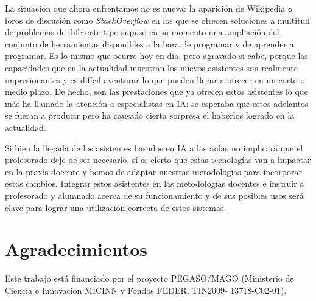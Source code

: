 \documentclass[twocolumn,twoside,a4paper, 10pt]{article}
\begin{document}
La situación que ahora enfrentamos no es nueva: la aparición de Wikipedia 
o foros de discusión como
\textit{StackOverflow} en los que se ofrecen soluciones a multitud de problemas de diferente tipo supuso en su
momento una ampliación del conjunto de herramientas disponibles a la hora de programar y de aprender a
programar.
Es lo mismo que ocurre hoy en día, pero agravado si cabe, porque las capacidades que en la
actualidad muestran los nuevos asistentes son realmente impresionantes y es difícil aventurar lo que pueden
llegar a ofrecer en un corto o medio plazo.
De hecho, son las prestaciones que ya ofrecen estos asistentes lo que más ha llamado la atención a
especialistas en IA: se esperaba que estos adelantos se fueran a producir pero ha causado cierta sorpresa el
haberlos logrado en la actualidad.

Si bien la llegada de los asistentes basados en IA a las aulas no implicará que el profesorado deje de ser
necesario, sí es cierto que estas tecnologías van a impactar en la praxis docente y hemos de adaptar nuestras
metodologías para incorporar estos cambios.
Integrar estos asistentes en las metodologías docentes e instruir a profesorado y alumnado acerca de su 
funcionamiento y de sus posibles usos será clave para lograr una utilización correcta de estos sistemas.

\section*{Agradecimientos}
Este trabajo está financiado por el proyecto PEGASO/MAGO (Ministerio de Ciencia e Innovación MICINN y Fondos FEDER, TIN2009- 13718-C02-01).

\balance{}


\end{document}
